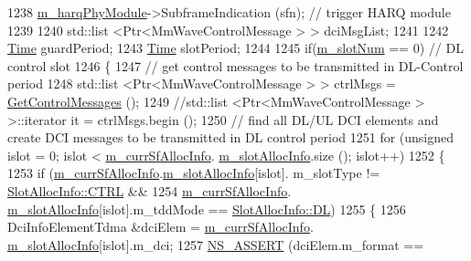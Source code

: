 \begin{DoxyCode}
1238   \hyperlink{classns3_1_1MmWaveEnbPhy_aa3e3b7fb0c5994726f3671b0afc51c58}{m\_harqPhyModule}->SubframeIndication (sfn);  \textcolor{comment}{// trigger HARQ module}
1239 
1240   std::list <Ptr<MmWaveControlMessage > > dciMsgList;
1241 
1242         \hyperlink{namespacens3_1_1TracedValueCallback_a7ffd3e7c142ffe7c8a1d2db9b8de38ec}{Time} guardPeriod;
1243         \hyperlink{namespacens3_1_1TracedValueCallback_a7ffd3e7c142ffe7c8a1d2db9b8de38ec}{Time} slotPeriod;
1244 
1245         \textcolor{keywordflow}{if}(\hyperlink{classns3_1_1MmWavePhy_a6c83cdb8c36a9a58ae8b9f17933680ac}{m\_slotNum} == 0) \textcolor{comment}{// DL control slot}
1246         \{
1247                 \textcolor{comment}{// get control messages to be transmitted in DL-Control period}
1248                 std::list <Ptr<MmWaveControlMessage > > ctrlMsgs = 
      \hyperlink{classns3_1_1MmWavePhy_a3ac83b01351f502d4b781ebf3216b8cc}{GetControlMessages} ();
1249                 \textcolor{comment}{//std::list <Ptr<MmWaveControlMessage > >::iterator it = ctrlMsgs.begin ();}
1250                 \textcolor{comment}{// find all DL/UL DCI elements and create DCI messages to be transmitted in DL control
       period}
1251                 \textcolor{keywordflow}{for} (\textcolor{keywordtype}{unsigned} islot = 0; islot < \hyperlink{classns3_1_1MmWavePhy_adf1e91c9da8a1d3f82b1517363cddbe8}{m\_currSfAllocInfo}.
      \hyperlink{structns3_1_1SfAllocInfo_a6a87109ff89bf270a74ff95a5bbf9231}{m\_slotAllocInfo}.size (); islot++)
1252                 \{
1253                         \textcolor{keywordflow}{if} (\hyperlink{classns3_1_1MmWavePhy_adf1e91c9da8a1d3f82b1517363cddbe8}{m\_currSfAllocInfo}.\hyperlink{structns3_1_1SfAllocInfo_a6a87109ff89bf270a74ff95a5bbf9231}{m\_slotAllocInfo}[islot].
      m\_slotType != \hyperlink{structns3_1_1SlotAllocInfo_a3ea7cb503bfd0c9a4df55a71b81b9331ad78b7d76ef82d56c33be1fa9c1867409}{SlotAllocInfo::CTRL} &&
1254                                         \hyperlink{classns3_1_1MmWavePhy_adf1e91c9da8a1d3f82b1517363cddbe8}{m\_currSfAllocInfo}.
      \hyperlink{structns3_1_1SfAllocInfo_a6a87109ff89bf270a74ff95a5bbf9231}{m\_slotAllocInfo}[islot].m\_tddMode == \hyperlink{structns3_1_1SlotAllocInfo_a6cad60db1d39034f1851e2cea625fe5da9a365c9c56b7c32dcae38ee1a468ce6d}{SlotAllocInfo::DL})
1255                         \{
1256                                 DciInfoElementTdma &dciElem = \hyperlink{classns3_1_1MmWavePhy_adf1e91c9da8a1d3f82b1517363cddbe8}{m\_currSfAllocInfo}.
      \hyperlink{structns3_1_1SfAllocInfo_a6a87109ff89bf270a74ff95a5bbf9231}{m\_slotAllocInfo}[islot].m\_dci;
1257                                 \hyperlink{assert_8h_a6dccdb0de9b252f60088ce281c49d052}{NS\_ASSERT} (dciElem.m\_format == 

\end{DoxyCode}
